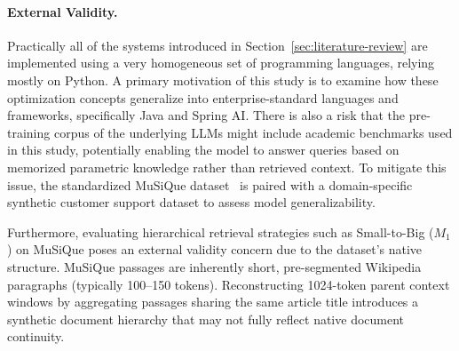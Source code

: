 \paragraph{External Validity.}
Practically all of the systems introduced in Section~\ref{sec:literature-review} are implemented using a very homogeneous set of programming languages, relying mostly on Python. A primary motivation of this study is to examine how these optimization concepts generalize into enterprise-standard languages and frameworks, specifically Java and Spring AI. There is also a risk that the pre-training corpus of the underlying LLMs might include academic benchmarks used in this study, potentially enabling the model to answer queries based on memorized parametric knowledge rather than retrieved context. To mitigate this issue, the standardized MuSiQue dataset~\citep{trivedi2022musique} is paired with a domain-specific synthetic customer support dataset to assess model generalizability.

Furthermore, evaluating hierarchical retrieval strategies such as Small-to-Big ($M_1$) on MuSiQue poses an external validity concern due to the dataset's native structure. MuSiQue passages are inherently short, pre-segmented Wikipedia paragraphs (typically 100--150 tokens). Reconstructing 1024-token parent context windows by aggregating passages sharing the same article title introduces a synthetic document hierarchy that may not fully reflect native document continuity.
